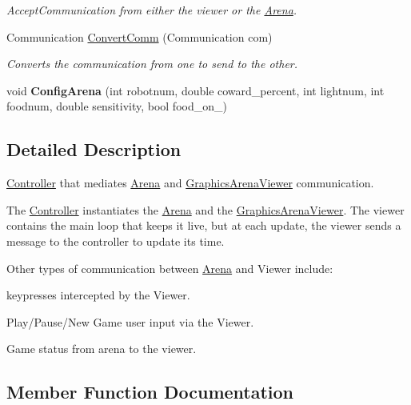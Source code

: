 \begin{DoxyCompactItemize}
\begin{DoxyCompactList}\small\item\em Accept\+Communication from either the viewer or the \hyperlink{class_arena}{Arena}. \end{DoxyCompactList}\item 
Communication \hyperlink{class_controller_ae9b0504ab74cdacc654528b609074adc}{Convert\+Comm} (Communication com)
\begin{DoxyCompactList}\small\item\em Converts the communication from one to send to the other. \end{DoxyCompactList}\item 
void {\bfseries Config\+Arena} (int robotnum, double coward\+\_\+percent, int lightnum, int foodnum, double sensitivity, bool food\+\_\+on\+\_\+)\hypertarget{class_controller_ad1d08bc573c4e2b454134b08a448aea1}{}\label{class_controller_ad1d08bc573c4e2b454134b08a448aea1}

\end{DoxyCompactItemize}


\subsection{Detailed Description}
\hyperlink{class_controller}{Controller} that mediates \hyperlink{class_arena}{Arena} and \hyperlink{class_graphics_arena_viewer}{Graphics\+Arena\+Viewer} communication. 

The \hyperlink{class_controller}{Controller} instantiates the \hyperlink{class_arena}{Arena} and the \hyperlink{class_graphics_arena_viewer}{Graphics\+Arena\+Viewer}. The viewer contains the main loop that keeps it live, but at each update, the viewer sends a message to the controller to update its time.

Other types of communication between \hyperlink{class_arena}{Arena} and Viewer include\+:
\begin{DoxyItemize}
\item keypresses intercepted by the Viewer.
\item Play/\+Pause/\+New Game user input via the Viewer.
\item Game status from arena to the viewer. 
\end{DoxyItemize}

\subsection{Member Function Documentation}
